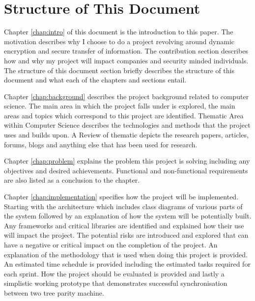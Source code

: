 \section{Structure of This Document}
Chapter \ref{chap:intro} of this document is the introduction to this paper. The motivation describes why I choose to do a project revolving around dynamic encryption and secure transfer of information. The contribution section describes how and why my project will impact companies and security minded individuals. The structure of this document section briefly describes the structure of this document and what each of the chapters and sections entail.

Chapter \ref{chap:background} describes the project background related to computer science. The main area in which the project falls under is explored, the main areas and topics which correspond to this project are identified. Thematic Area within Computer Science describes the technologies and methods that the project uses and builds upon. A Review of thematic depicts the research papers, articles, forums, blogs and anything else that has been used for research.

Chapter \ref{chap:problem} explains the problem this project is solving including any objectives and desired achievements. Functional and non-functional requirements are also listed as a conclusion to the chapter.

Chapter \ref{chap:implementation} specifies how the project will be implemented. Starting with the architecture which includes class diagrams of various parts of the system followed by an explanation of how the system will be potentially built. Any frameworks and critical libraries are identified and explained how their use will impact the project. The potential risks are introduced and explored that can have a negative or critical impact on the completion of the project. An explanation of the methodology that is used when doing this project is provided. An estimated time schedule is provided including the estimated tasks required for each sprint. How the project should be evaluated is provided and lastly a simplistic working prototype that demonstrates successful synchronisation between two tree parity machine.

